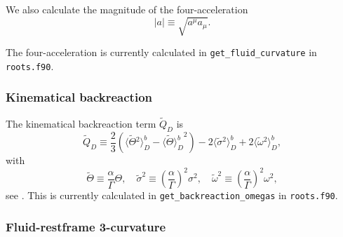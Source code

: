 \documentclass[a4paper]{article}
\newcommand{\avgb}[1]{\langle #1 \rangle^b_D}
\begin{document}
We also calculate the magnitude of the four-acceleration
\begin{equation}
	|a| \equiv \sqrt{a^\mu a_\mu}.
\end{equation}

The four-acceleration is currently calculated in \texttt{get\_fluid\_curvature} in \texttt{roots.f90}.

\subsubsection{Kinematical backreaction}

The kinematical backreaction term $\tilde{Q}_D$ is
\begin{equation}\label{eq:QD}
	\tilde{Q}_D \equiv \frac{2}{3} \left( \avgb{\tilde{\Theta}{}^2} - {\avgb{\tilde{\Theta}}}^2 \right) - 2 \avgb{\tilde{\sigma}{}^2} + 2 \avgb{\tilde{\omega}{}^2},
\end{equation}
with
\begin{equation}\label{eq:tildes}
	\tilde{\Theta} \equiv \frac{\alpha}{\Gamma} \Theta, \quad \tilde{\sigma}^2 \equiv \left(\frac{\alpha}{\Gamma}\right)^2 \sigma^2, \quad \tilde{\omega}^2 \equiv \left(\frac{\alpha}{\Gamma}\right)^2 \omega^2,
\end{equation}
see \citet{Buchert2020}. 
This is currently calculated in \texttt{get\_backreaction\_omegas} in \texttt{roots.f90}.


\subsubsection{Fluid-restframe 3-curvature}\label{sec:fluidR}
\end{document}
